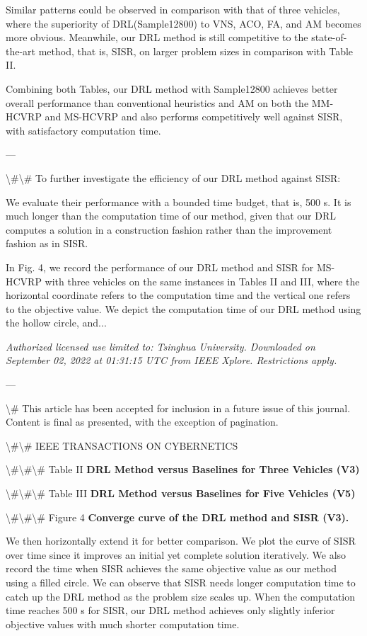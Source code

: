 \documentclass{article}
\begin{document}
	Similar patterns could be observed in comparison with that of three vehicles, where the superiority of DRL(Sample12800) to VNS, ACO, FA, and AM becomes more obvious. Meanwhile, our DRL method is still competitive to the state-of-the-art method, that is, SISR, on larger problem sizes in comparison with Table II.
	
	Combining both Tables, our DRL method with Sample12800 achieves better overall performance than conventional heuristics and AM on both the MM-HCVRP and MS-HCVRP and also performs competitively well against SISR, with satisfactory computation time.
	
	---
	
	\textbackslash{}#\textbackslash{}# To further investigate the efficiency of our DRL method against SISR:
	
	We evaluate their performance with a bounded time budget, that is, 500 s. It is much longer than the computation time of our method, given that our DRL computes a solution in a construction fashion rather than the improvement fashion as in SISR.
	
	In Fig. 4, we record the performance of our DRL method and SISR for MS-HCVRP with three vehicles on the same instances in Tables II and III, where the horizontal coordinate refers to the computation time and the vertical one refers to the objective value. We depict the computation time of our DRL method using the hollow circle, and...
	
	\textit{Authorized licensed use limited to: Tsinghua University. Downloaded on September 02, 2022 at 01:31:15 UTC from IEEE Xplore. Restrictions apply.}
	
	---
	
	\textbackslash{}# This article has been accepted for inclusion in a future issue of this journal. Content is final as presented, with the exception of pagination.
	
	\textbackslash{}#\textbackslash{}# IEEE TRANSACTIONS ON CYBERNETICS
	
	\textbackslash{}#\textbackslash{}#\textbackslash{}# Table II
	\textbf{DRL Method versus Baselines for Three Vehicles (V3)}
	
	\textbackslash{}#\textbackslash{}#\textbackslash{}# Table III
	\textbf{DRL Method versus Baselines for Five Vehicles (V5)}
	
	\textbackslash{}#\textbackslash{}#\textbackslash{}# Figure 4
	\textbf{Converge curve of the DRL method and SISR (V3).}
	
	We then horizontally extend it for better comparison. We plot the curve of SISR over time since it improves an initial yet complete solution iteratively. We also record the time when SISR achieves the same objective value as our method using a filled circle. We can observe that SISR needs longer computation time to catch up the DRL method as the problem size scales up. When the computation time reaches 500 s for SISR, our DRL method achieves only slightly inferior objective values with much shorter computation time.
	
\end{document}
